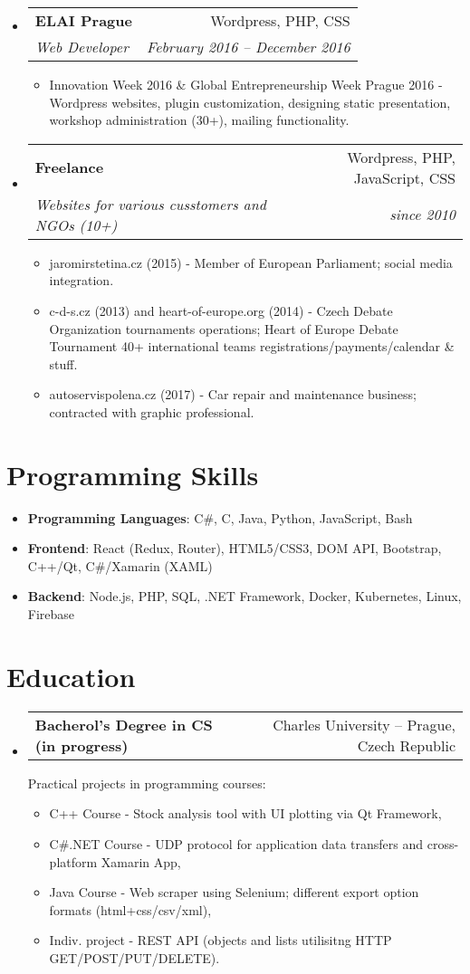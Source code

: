 \documentclass[letterpaper,11pt]{article}
\makeatletter
\newcommand{\sitem}[1]{\item #1 \vspace{-2pt}}
\newcommand{\resumeSubheading}[4]{
  \vspace{-1pt}\item
    \begin{tabular*}{0.97\textwidth}[t]{l@{\extracolsep{\fill}}r}
      \textbf{#1} & #2 \\
      \textit{\small#3} & \textit{\small #4} \\
    \end{tabular*}\vspace{-5pt}
}
\newcommand{\resumeSubheadingg}[2]{
  \vspace{-1pt}\item
    \begin{tabular*}{0.97\textwidth}[t]{l@{\extracolsep{\fill}}r}
      \textbf{#1} & #2
    \end{tabular*}\vspace{-5pt}
}
\newenvironment{subheadingListing}{\begin{itemize}[leftmargin=*]}{\end{itemize}}
\newenvironment{resumeList}{\begin{itemize}}{\end{itemize}\vspace{-5pt}}
\newcommand{\CC}{C\nolinebreak\hspace{-.05em}\raisebox{.4ex}{\tiny\bf +}\nolinebreak\hspace{-.10em}\raisebox{.4ex}{\tiny\bf +}}
\makeatother
\begin{document}
\begin{subheadingListing}
  \resumeSubheading
  {ELAI Prague}{Wordpress, PHP, CSS}
  {Web Developer}{February 2016 – December 2016}
  \begin{resumeList}
    \sitem{Innovation Week 2016 \& Global Entrepreneurship Week Prague 2016 - Wordpress websites, plugin customization, designing static presentation, workshop administration (30+), mailing functionality.}
 \end{resumeList}

  \resumeSubheading
  {Freelance}{Wordpress, PHP, JavaScript, CSS}
  {Websites for various cusstomers and NGOs (10+)}{since 2010}
  \begin{resumeList}
    \sitem{jaromirstetina.cz (2015) - Member of European Parliament; social media integration.}
    \sitem{c-d-s.cz (2013) and heart-of-europe.org (2014) - Czech Debate Organization tournaments operations; Heart of Europe Debate Tournament 40+ international teams registrations/payments/calendar \& stuff. }
    \sitem{autoservispolena.cz (2017) - Car repair and maintenance business; contracted with graphic professional.}  
  \end{resumeList}

\end{subheadingListing}


\section{Programming Skills}
\begin{subheadingListing}
  \sitem{
    \textbf{Programming Languages}{: C\#, \CC, Java, Python, JavaScript, Bash}
  }
  \sitem{
    \textbf{Frontend}{: React (Redux, Router), HTML5/CSS3, DOM API, Bootstrap, C++/Qt, C\#/Xamarin (XAML)}
  }
  \sitem{
    \textbf{Backend}{: Node.js, PHP, SQL, .NET Framework, Docker, Kubernetes, Linux, Firebase}
  }
\end{subheadingListing}


\section{Education}
\begin{subheadingListing}

  \resumeSubheadingg
  {Bacherol's Degree in CS (in progress)}{Charles University – Prague, Czech Republic}

  Practical projects in programming courses:
  \begin{resumeList}
    \sitem{C++ Course - Stock analysis tool with UI plotting via Qt Framework,}
    \sitem{C\#.NET Course - UDP protocol for application data transfers and cross-platform Xamarin App,}
    \sitem{Java Course - Web scraper using Selenium; different export option formats (html+css/csv/xml),}
    \sitem{Indiv. project - REST API (objects and lists utilisitng HTTP GET/POST/PUT/DELETE).}
  \end{resumeList}
\end{subheadingListing}
\end{document}
